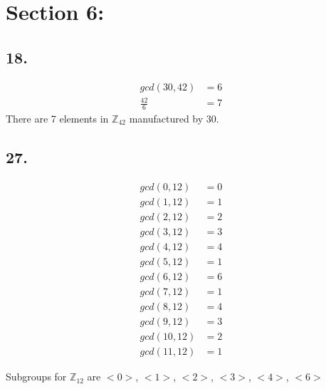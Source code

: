 \documentclass{article}
\begin{document}
\section*{Section 6: }
\subsection*{18. }
\begin{align*}
	gcd(30, 42) &= 6&\\
	\frac{42}{6} &= 7&
\end{align*}
There are 7 elements in $\mathbb{Z}_{42}$ manufactured by 30.

\subsection*{27. }

\begin{align*}
	gcd(0, 12) &= 0 &\\
	gcd(1, 12) &= 1 &\\
	gcd(2, 12) &= 2 &\\
	gcd(3, 12) &= 3 &\\
	gcd(4, 12) &= 4 &\\
	gcd(5, 12) &= 1 &\\
	gcd(6, 12) &= 6 &\\
	gcd(7, 12) &= 1 &\\
	gcd(8, 12) &= 4 &\\
	gcd(9, 12) &= 3 &\\
	gcd(10, 12) &= 2 &\\
	gcd(11, 12) &= 1 &
\end{align*}

Subgroups for $\mathbb{Z}_{12}$ are $<0>$, $<1>$, $<2>$, $<3>$, $<4>$, $<6>$
\end{document}

